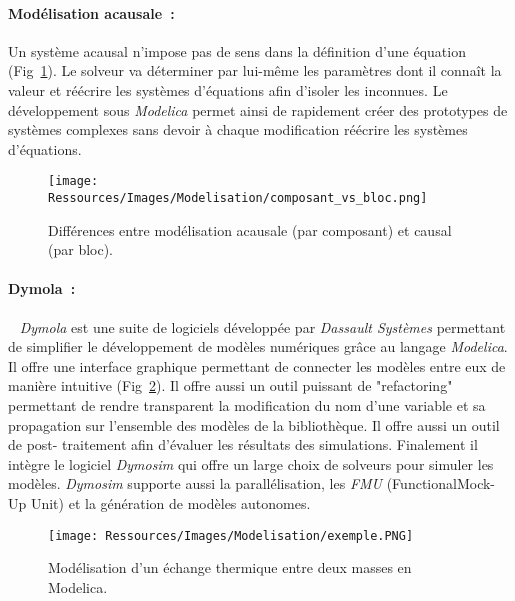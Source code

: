 \paragraph{Modélisation acausale~:} %
\label{par:modelisation_acausale}
Un système acausal n’impose pas de sens dans la définition d’une équation (Fig~\ref{fig:acausal_vs_causal}).  Le
solveur va déterminer par lui-même les paramètres dont il connaît la valeur et réécrire
les systèmes d’équations afin d’isoler les inconnues. Le développement sous \textit{Modelica}
permet ainsi de rapidement créer des prototypes de systèmes complexes sans devoir à chaque
modification réécrire les systèmes d’équations.
\begin{figure}
    \begin{center}
        \texttt{[image: Ressources/Images/Modelisation/composant\_vs\_bloc.png]}
    \end{center}
    \caption{Différences entre modélisation acausale (par composant) et causal (par bloc).
             \label{fig:acausal_vs_causal}}
\end{figure}

\paragraph{Dymola~:} %
\label{par:dymola}
~
\textit{Dymola} est une suite de logiciels développée par \textit{Dassault Systèmes} permettant de
simplifier le développement de modèles numériques grâce au langage \textit{Modelica}. Il offre une
interface graphique permettant de connecter les modèles entre eux de manière intuitive
(Fig~\ref{fig:exemple_modelica}). Il offre aussi un outil puissant de "refactoring" permettant de rendre
transparent la modification du nom d’une variable et sa propagation sur l’ensemble
des modèles de la bibliothèque. Il offre aussi un outil de post-
traitement afin d’évaluer les résultats des simulations. Finalement il intègre le logiciel
\textit{Dymosim} qui offre un large choix de solveurs pour simuler les modèles. \textit{Dymosim} supporte
aussi la parallélisation, les \emph{FMU} (FunctionalMock-Up Unit) et la génération de modèles
autonomes.
\begin{figure}
    \begin{center}
        \texttt{[image: Ressources/Images/Modelisation/exemple.PNG]}
    \end{center}
    \caption{Modélisation d’un échange thermique entre deux masses en Modelica.
             \label{fig:exemple_modelica}}
\end{figure}

